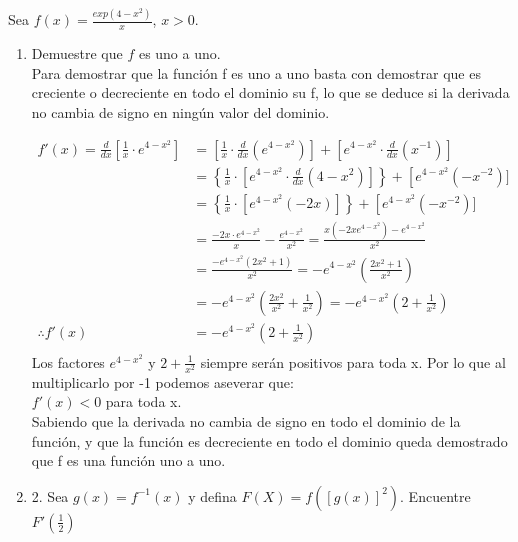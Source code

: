 \documentclass[12pt]{article}
\begin{document}
Sea $f(x)=\frac{exp(4-x^2)}{x}$, $x>0$.
\begin{enumerate}
\item Demuestre que $f$ es uno a uno. \\
  Para demostrar que la función f es uno a uno basta con demostrar que es creciente o decreciente en todo el dominio su f, lo que se deduce si la derivada no cambia de signo en ningún valor del dominio.

\[ \begin{equation*}
  \begin{split}
    f'(x) =  \frac{d}{dx} \left[\frac{1}{x} \cdot e^{4-x^2}\right]
    &= \left[\frac {1}{x}\cdot \frac{d}{dx}(e^{4-x^2}) \right] + \left[e^{4-x^2}\cdot \frac{d}{dx}(x^{-1})\right] \\
    &= \left\lbrace \frac{1}{x} \cdot \left[e^{4-x^2} \cdot \frac{d}{dx}(4-x^2) \right] \right\rbrace + \left[e^{4-x^2}(-x^{-2})] \\
    &=  \left\lbrace \frac{1}{x} \cdot \left[e^{4-x^2} ( -2x) \right] \right\rbrace + \left[e^{4-x^2}(-x^{-2})] \\
    &= \frac{-2x \cdot e^{4-x^2}}{x} - \frac {e^{4-x^2}}{x^{2}}= \frac{x(-2x  e^{4-x^2})- e^{4-x^2} }{x^2}\\
    &= \frac{-e^{4-x^2} (2x^{2}+1) }{x^2} = -e^{4-x^2} ( \frac{2x^{2}+1}{x^2})\\
     &=  -e^{4-x^2}( \frac{2x^{2}}{x^2} +\frac{1}{x^2}) =   -e^{4-x^2} (2 +\frac{1}{x^2})\\
    \therefore
    f'(x) 
    & =  -e^{4-x^2} (2 +\frac{1}{x^2})  \\
  \end{split}
\end{equation*}
\]
  Los factores $ e^{4-x^2}$  y  $2 +\frac{1}{x^2}$ siempre serán positivos para toda x. Por lo que al multiplicarlo por -1 podemos aseverar que: \\
  $f'(x) <0 $ para toda x.\\
  Sabiendo que la derivada no cambia de signo en todo el dominio de la función, y que la función es decreciente en todo el dominio queda demostrado que f es una función uno a uno.\\
\item 2. Sea $g(x)=f^{-1}(x)$ y defina $F(X)=f([g(x)]^2)$. Encuentre $F'\left(\frac{1}{2}\right)$ \\
  

\end{enumerate}
\end{document}
